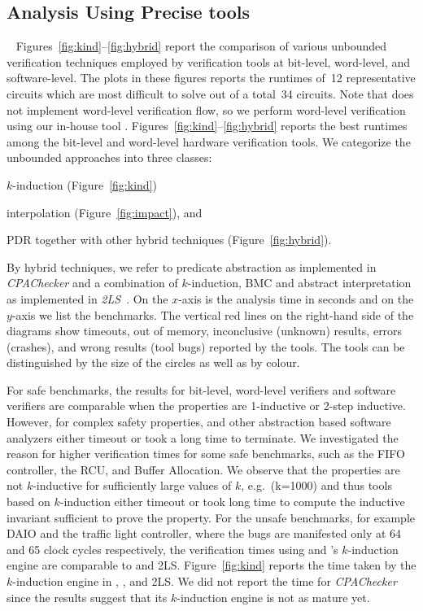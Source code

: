 \subsection{Analysis Using Precise tools}~\label{precise}
%
Figures~\ref{fig:kind}--\ref{fig:hybrid} report the comparison of various unbounded 
verification techniques employed by verification tools at bit-level, word-level, 
and software-level.  The plots in these figures reports the runtimes of~12 
representative circuits which are most difficult to solve out of a total~34 
circuits.  Note that \ABC does not implement word-level verification flow, 
so we perform word-level verification using our in-house tool \ebmc.
Figures~\ref{fig:kind}--\ref{fig:hybrid} reports the best runtimes 
among the bit-level and word-level hardware verification tools.  
%
We categorize the unbounded approaches into three classes:
\begin{compactitem}
\item $k$-induction (Figure~\ref{fig:kind})
\item interpolation (Figure~\ref{fig:impact}), and 
\item PDR together with other hybrid techniques (Figure~\ref{fig:hybrid}).  
\end{compactitem}
By hybrid techniques, we refer to predicate
abstraction as implemented in \emph{CPAChecker} and a combination of
$k$-induction, BMC and abstract interpretation as implemented in
\emph{2LS}~\cite{kiki}.  On the $x$-axis is the analysis time in
seconds and on the $y$-axis we list the benchmarks. The vertical red lines on
the right-hand side of the diagrams show timeouts, out of memory,
inconclusive (unknown) results, errors (crashes), and wrong results
(tool bugs) reported by the tools. The tools can be distinguished 
by the size of the circles as well as by colour. 

 For safe benchmarks, the results
for bit-level, word-level verifiers and software verifiers are
comparable when the properties are 1-inductive or 2-step inductive.
However, for complex safety properties, \ABC and other abstraction
based software analyzers either timeout or took a long time to
terminate.  We investigated the reason for higher verification times
for some safe benchmarks, such as the FIFO controller, the RCU, and Buffer 
Allocation.  We observe that the properties are not $k$-inductive for
sufficiently large values of $k$, e.g.\ (k=1000) and thus tools based
on $k$-induction either timeout or took long time to
compute the inductive invariant sufficient to prove the property. For
the unsafe benchmarks, for example DAIO and the traffic light controller, where
the bugs are manifested only at 64 and 65 clock cycles respectively,
the verification times using \ABC and \ebmc's $k$-induction engine 
are comparable to \cbmcv and \textsc{2LS}. Figure~\ref{fig:kind} 
reports the time taken by the $k$-induction engine in 
\ABC, \ebmcv, \cbmcv and \textsc{2LS}.  We did not report
the time for \emph{CPAChecker} since the results suggest that 
its $k$-induction engine is not as mature yet. 

